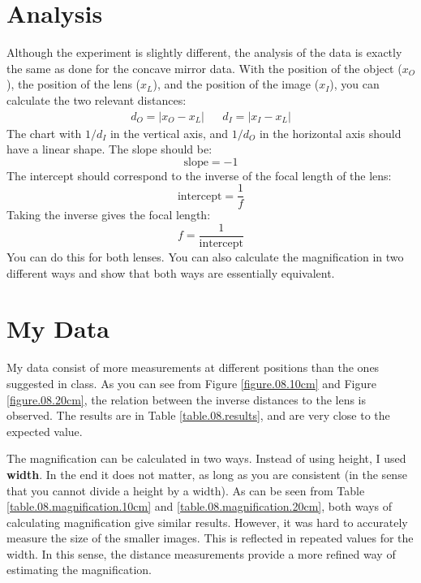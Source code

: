 \section{Analysis}
%
Although the experiment is slightly different, the analysis of the data is exactly the same as done for the concave mirror data. With the position of the object ($x_{O}$), the position of the lens ($x_{L}$), and the position of the image ($x_{I}$), you can calculate the two relevant distances:
\begin{align}
    d_{O} = \left\vert x_{O} - x_{L} \right\vert && d_{I} = \left\vert x_{I} - x_{L} \right\vert
\end{align}
The chart with $1/d_{I}$ in the vertical axis, and $1/d_{O}$ in the horizontal axis should have a linear shape. The slope should be:
\begin{equation}
    \text{slope} = -1
\end{equation}
The intercept should correspond to the inverse of the focal length of the lens:
\begin{equation}
    \text{intercept} = \frac{1}{f}
\end{equation}
Taking the inverse gives the focal length:
\begin{equation}
    f = \frac{1}{\text{intercept}}
\end{equation}
You can do this for both lenses. You can also calculate the magnification in two different ways and show that both ways are essentially equivalent.
%
\section{My Data}
%
My data consist of more measurements at different positions than the ones suggested in class. As you can see from Figure \ref{figure.08.10cm} and Figure \ref{figure.08.20cm}, the relation between the inverse distances to the lens is observed. The results are in Table \ref{table.08.results}, and are very close to the expected value.

The magnification can be calculated in two ways. Instead of using height, I used \textbf{width}. In the end it does not matter, as long as you are consistent (in the sense that you cannot divide a height by a width). As can be seen from Table \ref{table.08.magnification.10cm} and \ref{table.08.magnification.20cm}, both ways of calculating magnification give similar results. However, it was hard to accurately measure the size of the smaller images. This is reflected in repeated values for the width. In this sense, the distance measurements provide a more refined way of estimating the magnification.
%
